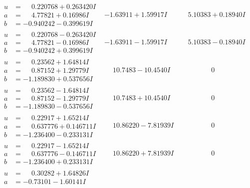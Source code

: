 \documentclass[1p]{elsarticle_modified}
\theoremstyle{definition}
\begin{document}
$$\begin{array}{c|c|c}
 \hline 
\begin{aligned}
u &= \phantom{-}0.220768 + 0.263420 I \\
a &= \phantom{-}4.77821 + 0.16986 I \\
b &= -0.940242 - 0.399619 I\end{aligned}
 & -1.63911 + 1.59917 I & \phantom{-}5.10383 + 0.18940 I \\ \hline\begin{aligned}
u &= \phantom{-}0.220768 - 0.263420 I \\
a &= \phantom{-}4.77821 - 0.16986 I \\
b &= -0.940242 + 0.399619 I\end{aligned}
 & -1.63911 - 1.59917 I & \phantom{-}5.10383 - 0.18940 I \\ \hline\begin{aligned}
u &= \phantom{-}0.23562 + 1.64814 I \\
a &= \phantom{-}0.87152 + 1.29779 I \\
b &= -1.189830 + 0.537656 I\end{aligned}
 & \phantom{-}10.7483 - 10.4540 I & \phantom{-0.000000 } 0 \\ \hline\begin{aligned}
u &= \phantom{-}0.23562 - 1.64814 I \\
a &= \phantom{-}0.87152 - 1.29779 I \\
b &= -1.189830 - 0.537656 I\end{aligned}
 & \phantom{-}10.7483 + 10.4540 I & \phantom{-0.000000 } 0 \\ \hline\begin{aligned}
u &= \phantom{-}0.22917 + 1.65214 I \\
a &= \phantom{-}0.637776 + 0.146711 I \\
b &= -1.236400 - 0.233131 I\end{aligned}
 & \phantom{-}10.86220 - 7.81939 I & \phantom{-0.000000 } 0 \\ \hline\begin{aligned}
u &= \phantom{-}0.22917 - 1.65214 I \\
a &= \phantom{-}0.637776 - 0.146711 I \\
b &= -1.236400 + 0.233131 I\end{aligned}
 & \phantom{-}10.86220 + 7.81939 I & \phantom{-0.000000 } 0 \\ \hline\begin{aligned}
u &= \phantom{-}0.30282 + 1.64826 I \\
a &= -0.73101 - 1.60141 I \\

\end{aligned}
\end{array}$$
\end{document}
